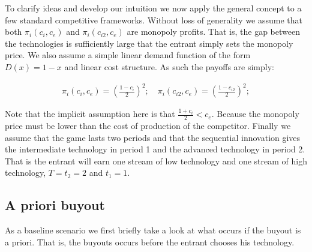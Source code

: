 \documentclass[11pt]{article}
\begin{document}
To clarify ideas and develop our intuition we now apply the general concept to a few standard competitive frameworks. Without loss of generality we assume that both $\pi_i(c_i,c_e)$ and
$\pi_i(c_{i2},c_e)$ are monopoly profits. That is, the gap between the technologies is sufficiently large that the entrant simply sets the monopoly price. We also assume a simple linear demand function of the form $D(x)=1-x$ and linear cost structure.  As such the payoffs are simply: 

\begin{align*}
\pi_i(c_i,c_e) = 
\left(\frac{1-c_i}{2}\right)^2; \quad \pi_i(c_{i2},c_e) = \left(\frac{1-c_{i2}}{2}\right)^2;  
\end{align*}

Note that the implicit assumption here is that $\frac{1+c_i}{2}<c_e$. Because the monopoly price must be lower than the cost of production of the competitor. Finally we assume that the game lasts two periods and that the sequential innovation gives the intermediate technology in period 1 and the advanced technology in period 2. That is the entrant will earn one stream of low technology and one stream of high technology, $T=t_2=2$ and $t_1=1$.

\subsection*{A priori buyout}

As a baseline scenario we first briefly take a look at what occurs if the buyout is a priori. That is, the buyouts occurs before the entrant chooses his technology. 
\end{document}

